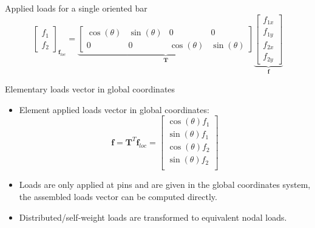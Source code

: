 \documentclass[aspectratio=169]{beamer}
\begin{document}
\begin{frame}{Applied loads for a single oriented bar}
$${\begin{bmatrix}
        f_{1} \\ f_{2}
      \end{bmatrix}}_\text{$\mathbf f_{loc}$}=\underbrace{\begin{bmatrix}
        \cos(\theta) & \sin(\theta) & 0            & 0            \\
        0            & 0            & \cos(\theta) & \sin(\theta)
      \end{bmatrix}}_\text{$\mathbf T$}\underbrace{\begin{bmatrix}
        f_{1x} \\ f_{1y} \\  f_{2x} \\  f_{2y}
      \end{bmatrix}}_\text{$\mathbf f$}
  $$
\end{frame}


\begin{frame}{Elementary loads vector in global coordinates}
  \begin{itemize}
    \item Element applied loads vector in global coordinates:
          \[
            \mathbf{f} = \mathbf T^T \mathbf{f}_{loc} =\begin{bmatrix}
              \cos(\theta)f_1 \\
              \sin(\theta)f_1 \\
              \cos(\theta)f_2 \\
              \sin(\theta)f_2 \\
            \end{bmatrix}
          \]
  \end{itemize}

  \vspace{0.5em}
  \begin{itemize}
    \item Loads are only applied at pins and are given in the global coordinates system, the assembled loads vector can be computed directly.
    \item Distributed/self-weight loads are transformed to equivalent nodal loads.
  \end{itemize}
\end{frame}
\end{document}
